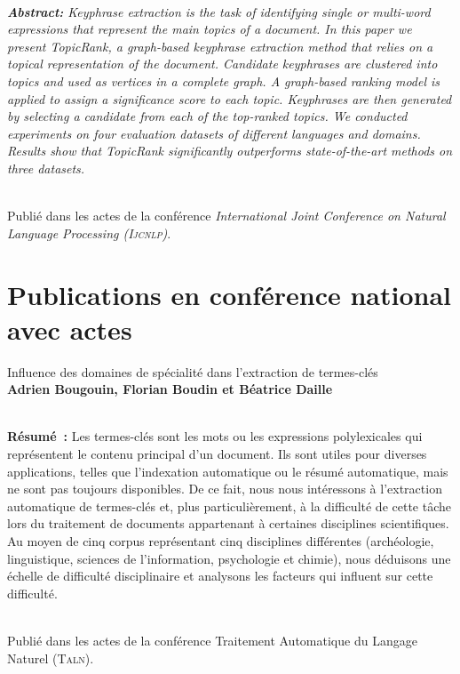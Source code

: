   ~\\\textit{
    \textbf{Abstract:}
    Keyphrase extraction is the task of identifying single or multi-word
    expressions that represent the main topics of a document. In this paper we
    present TopicRank, a graph-based keyphrase extraction method that relies on
    a topical representation of the document. Candidate keyphrases are clustered
    into topics and used as vertices in a complete graph. A graph-based ranking
    model is applied to assign a significance score to each topic. Keyphrases
    are then generated by selecting a candidate from each of the top-ranked
    topics. We conducted experiments on four evaluation datasets of different
    languages and domains. Results show that TopicRank significantly outperforms
    state-of-the-art methods on three datasets.
  }

  ~\\Publié dans les actes de la conférence \textit{International Joint
  Conference on Natural Language Processing (\textsc{Ijcnlp})}.

  \section*{Publications en conférence national avec actes}

  Influence des domaines de spécialité dans l'extraction de
  termes-clés\\\textbf{Adrien Bougouin, Florian Boudin et Béatrice
  Daille}\\\cite{bougouin2014difficulty}

  ~\\\textbf{Résumé~:}
  Les termes-clés sont les mots ou les expressions polylexicales qui
  représentent le contenu principal d'un document. Ils sont utiles pour
  diverses applications, telles que l'indexation automatique ou le résumé
  automatique, mais ne sont pas toujours disponibles. De ce fait, nous nous
  intéressons à l'extraction automatique de termes-clés et, plus
  particulièrement, à la difficulté de cette tâche lors du traitement de
  documents appartenant à certaines disciplines scientifiques. Au moyen de
  cinq corpus représentant cinq disciplines différentes (archéologie,
  linguistique, sciences de l'information, psychologie et chimie), nous
  déduisons une échelle de difficulté disciplinaire et analysons les facteurs
  qui influent sur cette difficulté.

  ~\\Publié dans les actes de la conférence Traitement Automatique du Langage
  Naturel (\textsc{Taln}).

